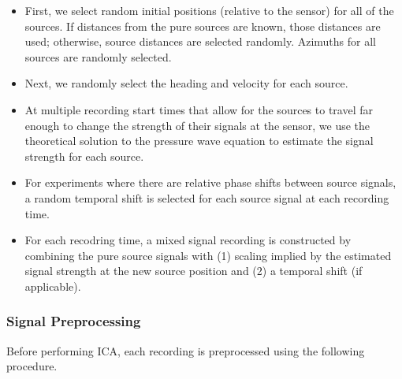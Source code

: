 \documentclass[10pt]{article}
\begin{document}
\begin{itemize}
    \item First, we select random initial positions (relative to the sensor) for all of
        the sources. If distances from the pure sources are known, those distances are
        used; otherwise, source distances are selected randomly. Azimuths for all sources
        are randomly selected.

    \item Next, we randomly select the heading and velocity for each source.

    \item At multiple recording start times that allow for the sources to travel far
        enough to change the strength of their signals at the sensor, we use the
        theoretical solution to the pressure wave equation to estimate the signal strength
        for each source.

    \item For experiments where there are relative phase shifts between source signals,
        a random temporal shift is selected for each source signal at each recording time.

    \item For each recodring time, a mixed signal recording is constructed by combining
        the pure source signals with (1) scaling implied by the estimated signal
        strength at the new source position and (2) a temporal shift (if applicable).
\end{itemize}

\subsubsection*{Signal Preprocessing}
Before performing ICA, each recording is preprocessed using the following procedure.
\end{document}

